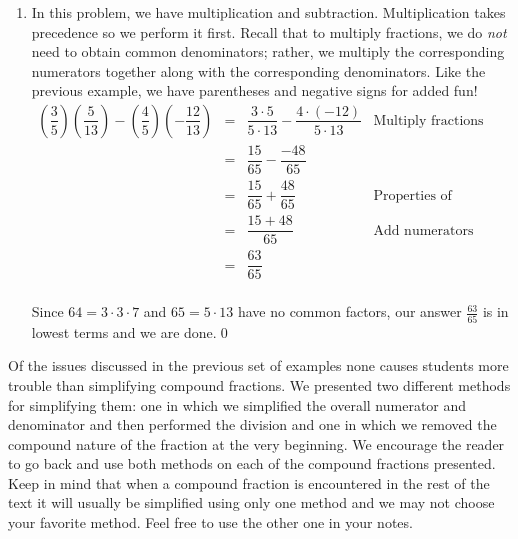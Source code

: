 \begin{ex}
\begin{enumerate}
\item  In this problem, we have multiplication and subtraction.  Multiplication takes precedence so we perform it first.  Recall that to multiply fractions, we do \textit{not} need to obtain common denominators;  rather, we multiply the corresponding numerators together along with the corresponding denominators.  Like the previous example, we have parentheses and negative signs for added fun!\[ \begin{array}{rclr}

\left(\dfrac{3}{5} \right) \left(\dfrac{5}{13} \right) - \left(\dfrac{4}{5}\right) \left( - \dfrac{12}{13}\right) & = & \dfrac{3 \cdot 5}{5 \cdot 13} - \dfrac{4\cdot (-12)}{5 \cdot 13} & \text{Multiply fractions}\\ [8pt]

& = & \dfrac{15}{65} - \dfrac{-48}{65} & \\[10pt]
& = & \dfrac{15}{65} + \dfrac{48}{65} & \text{Properties of Negatives}\\[10pt]
& = & \dfrac{15+48}{65}  & \text{Add numerators} \\ [10pt]
& = & \dfrac{63}{65}  & \\ \end{array} \]

Since $64 = 3 \cdot 3 \cdot 7$ and $65 = 5 \cdot 13$ have no common factors, our answer $\frac{63}{65}$ is in lowest terms and we are done.\qed

\end{enumerate}

\end{ex} 

Of the issues discussed in the previous set of examples none causes students more trouble than simplifying compound fractions.  We presented two different methods for simplifying them:  one in which we simplified the overall numerator and denominator and then performed the division and one in which we removed the compound nature of the fraction at the very beginning.   We encourage the reader to go back and use both methods on each of the compound fractions presented.  Keep in mind that when a compound fraction is encountered in the rest of the text it will usually be simplified using only one method and we may not choose your favorite method.  Feel free to use the other one in your notes.

\smallskip

